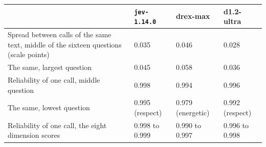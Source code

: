 {\footnotesize
\begin{tabularx}{\textwidth}{@{}>{\raggedright\arraybackslash}Xlll@{}}
\toprule
 & \texttt{jev-1.14.0} & drex-max & d1.2-ultra \\
\midrule
Spread between calls of the same text, middle of the sixteen questions (scale points) & 0.035 & 0.046 & 0.028 \\
The same, largest question & 0.045 & 0.058 & 0.036 \\
Reliability of one call, middle question & 0.998 & 0.994 & 0.996 \\
The same, lowest question & 0.995 (respect) & 0.979 (energetic) & 0.992 (respect) \\
Reliability of one call, the eight dimension scores & 0.998 to 0.999 & 0.990 to 0.997 & 0.996 to 0.998 \\
\bottomrule
\end{tabularx}}

